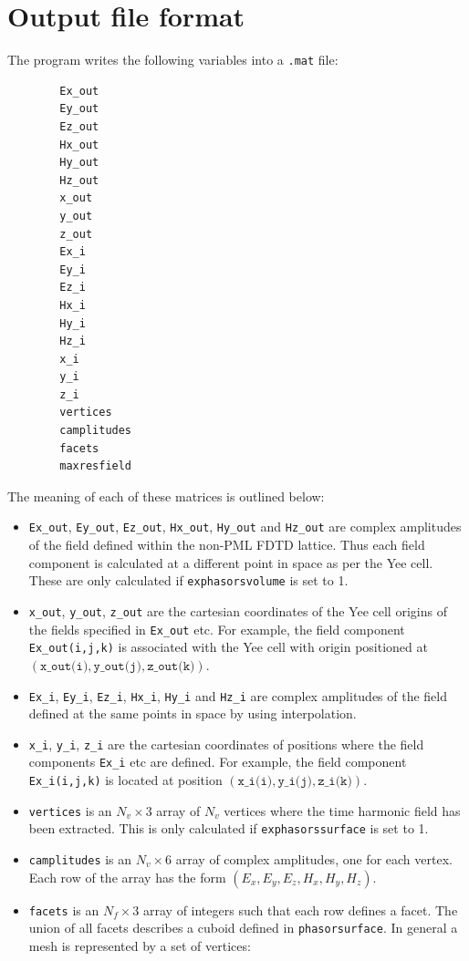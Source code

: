 \documentclass[a4paper, 12pt]{article}
\begin{document}
	\section{Output file format}
	The program writes the following variables into a \verb+.mat+ file:
	\begin{verbatim}
		Ex_out
		Ey_out
		Ez_out
		Hx_out
		Hy_out
		Hz_out
		x_out
		y_out
		z_out
		Ex_i
		Ey_i
		Ez_i
		Hx_i
		Hy_i
		Hz_i
		x_i
		y_i
		z_i
		vertices
		camplitudes
		facets
		maxresfield
	\end{verbatim}
	The meaning of each of these matrices is outlined below:
	\begin{itemize}
		\item \verb+Ex_out+, \verb+Ey_out+, \verb+Ez_out+, \verb+Hx_out+,
		\verb+Hy_out+ and \verb+Hz_out+ are complex amplitudes of the field
		defined within the non-PML FDTD lattice. Thus each field component is
		calculated at a different point in space as per the Yee cell. These
		are only calculated if \verb+exphasorsvolume+ is set to 1.
		\item \verb+x_out+, \verb+y_out+, \verb+z_out+ are the cartesian
		coordinates of the Yee cell origins of the fields specified in
		\verb+Ex_out+ etc. For example, the field component
		\verb+Ex_out(i,j,k)+ is associated with the Yee cell with origin
		positioned at
		$(\texttt{x\_out(i)},\texttt{y\_out(j)},\texttt{z\_out(k)})$.
		\item \verb+Ex_i+, \verb+Ey_i+, \verb+Ez_i+, \verb+Hx_i+,
		\verb+Hy_i+ and \verb+Hz_i+ are complex amplitudes of the field
		defined at the same points in space by using interpolation.
		\item \verb+x_i+, \verb+y_i+, \verb+z_i+ are the cartesian
		coordinates of positions where the field components \verb+Ex_i+ etc
		are defined. For example, the field component
		\verb+Ex_i(i,j,k)+ is located at position
		$(\texttt{x\_i(i)},\texttt{y\_i(j)},\texttt{z\_i(k)})$.
		\item \verb+vertices+ is an $N_v\times 3$ array of $N_v$ vertices where the
		time harmonic field has been extracted. This is only calculated if
		\verb+exphasorssurface+ is set to 1.
		\item \verb+camplitudes+ is an $N_v\times 6$ array of complex
		amplitudes, one for each vertex. Each row of the array has the form
		$(E_x,E_y,E_z,H_x,H_y,H_z)$.
		\item \verb+facets+ is an $N_f\times 3$ array of integers such that
		each row defines a facet. The union of all facets describes a cuboid
		defined in \verb+phasorsurface+. In general a mesh is represented by a set of vertices:

\end{itemize}
\end{document}

